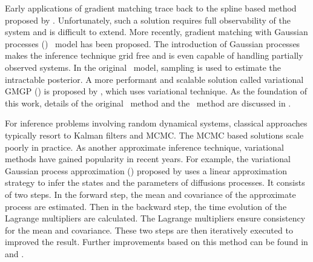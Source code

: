 Early applications of gradient matching trace back to the spline based method proposed by \cite{ramsay2007parameter}.
Unfortunately, such a solution requires full observability of the system and is difficult to extend.
More recently, gradient matching with Gaussian processes (\algogmgp)\ \citep{calderhead2009accelerating, dondelinger2013ode} model has been proposed.
The introduction of Gaussian processes makes the inference technique grid free and is even capable of handling partially observed systems.
In the original \algogmgp\ model, sampling is used to estimate the intractable posterior.
A more performant and scalable solution called variational GMGP (\algovgmgp) is proposed by \cite{gorbach2017scalable}, which uses variational technique.
As the foundation of this work, details of the original \algogmgp\ method and the \algovgmgp\ method are discussed in .

For inference problems involving random dynamical systems, classical approaches typically resort to Kalman filters and MCMC.
The MCMC based solutions scale poorly in practice.
As another approximate inference technique, variational methods have gained popularity in recent years.
For example, the variational Gaussian process approximation (\algovgpa) proposed by \cite{archambeau2007gaussian} uses a linear approximation strategy to infer the states and the parameters of diffusions processes.
It consists of two steps.
In the forward step, the mean and covariance of the approximate process are estimated.
Then in the backward step, the time evolution of the Lagrange multipliers are calculated.
The Lagrange multipliers ensure consistency for the mean and covariance.
These two steps are then iteratively executed to improved the result.
Further improvements based on this method can be found in \cite{archambeau2008variational} and \cite{vrettas2011estimating, vrettas2015variational}.


